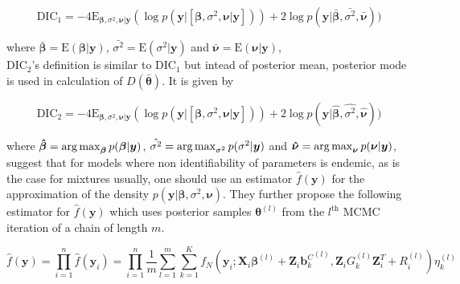 \begin{equation}
\label{eq : DIC1}
\text{DIC}_1 = -4\text{E}_{\boldsymbol{\beta}, \sigma^2, \boldsymbol{\nu}|\boldsymbol{y}} (\log{p(\boldsymbol{y}|[\boldsymbol{\beta}, \sigma^2, \boldsymbol{\nu}|\boldsymbol{y}])}) + 2\log{p(\boldsymbol{y}|\boldsymbol{\bar{\beta}}, \bar{\sigma^2}, \boldsymbol{\bar{\nu}})})
\end{equation}

where 
$\boldsymbol{\bar{\beta}}=\text{E}(\boldsymbol{\beta}|\boldsymbol{y})$, 
$\bar{\sigma^2}=\text{E}(\sigma^2|\boldsymbol{y})$ and 
$\boldsymbol{\bar{\nu}}=\text{E}(\boldsymbol{\nu}|\boldsymbol{y})$,\\

$\text{DIC}_2$'s definition is similar to $\text{DIC}_1$ but intead of posterior mean, posterior mode is used in calculation of $D(\boldsymbol{\bar{\theta}})$. It is given by

\begin{equation}
\label{eq : DIC2}
\text{DIC}_2 = -4\text{E}_{\boldsymbol{\beta}, \sigma^2, \boldsymbol{\nu}|\boldsymbol{y}}(\log{p(\boldsymbol{y}|[\boldsymbol{\beta}, \sigma^2, \boldsymbol{\nu}|\boldsymbol{y}])}) + 2\log{p(\boldsymbol{y}|\boldsymbol{\hat{\beta}}, \hat{\sigma^2}, \boldsymbol{\hat{\nu}})})
\end{equation}

where
$\boldsymbol{\hat{\beta}} = \operatorname*{arg\,max}_{\boldsymbol{\beta}}p(\boldsymbol{\beta}|\boldsymbol{y})$,
$\hat{\sigma^2} = \operatorname*{arg\,max}_{\sigma^2}p(\sigma^2|\boldsymbol{y})$ and
$\boldsymbol{\hat{\nu}} = \operatorname*{arg\,max}_{\boldsymbol{\nu}}p(\boldsymbol{\nu}|\boldsymbol{y})$,\\

\citet{celeux_deviance_2006} suggest that for models where non identifiability of parameters is endemic, as is the case for mixtures usually, one should use an estimator $\hat{f}(\boldsymbol{y})$ for the approximation of the density $p(\boldsymbol{y} | \boldsymbol{\beta}, \sigma^2, \boldsymbol{\nu})$. They further propose the following estimator for $\hat{f}(\boldsymbol{y})$ which uses posterior samples $\boldsymbol{\theta}^{(l)}$ from the $l^{\text{th}}$ MCMC iteration of a chain of length $m$.

$$\hat{f}(\boldsymbol{y}) = \prod_{i=1}^n \hat{f}(\boldsymbol{y}_i) = \prod_{i=1}^n \frac 1 m \sum_{l=1}^m \sum_{k=1}^K f_N(\boldsymbol{y}_i; \boldsymbol{X}_i\boldsymbol{\beta}^{(l)} + \boldsymbol{Z}_i {\boldsymbol{b}_k^C}^{(l)}, \boldsymbol{Z}_{i} G_k^{(l)} \boldsymbol{Z}_{i}^T+ R_i^{(l)}) \eta_k^{(l)}$$

